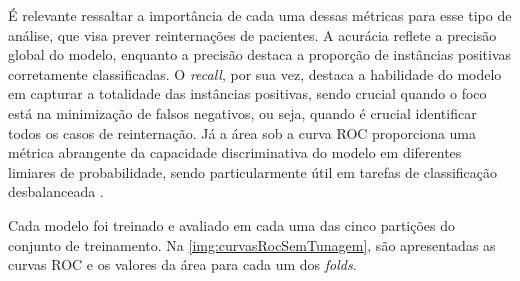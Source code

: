 É relevante ressaltar a importância de cada uma dessas métricas para esse tipo de análise, que visa prever reinternações de pacientes. A acurácia reflete a precisão global do modelo, enquanto a precisão destaca a proporção de instâncias positivas corretamente classificadas. O \textit{recall}, por sua vez, destaca a habilidade do modelo em capturar a totalidade das instâncias positivas, sendo crucial quando o foco está na minimização de falsos negativos, ou seja, quando é crucial identificar todos os casos de reinternação. Já a área sob a curva ROC proporciona uma métrica abrangente da capacidade discriminativa do modelo em diferentes limiares de probabilidade, sendo particularmente útil em tarefas de classificação desbalanceada \cite{geron2022hands}.

Cada modelo foi treinado e avaliado em cada uma das cinco partições do conjunto de treinamento. Na \autoref{img:curvasRocSemTunagem}, são apresentadas as curvas ROC e os valores da área para cada um dos \textit{folds}.

